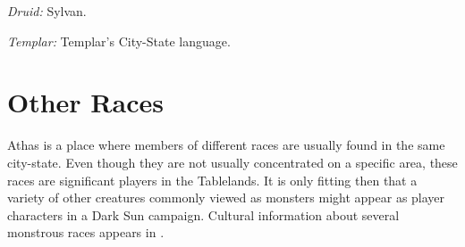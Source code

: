 \textit{Druid:} Sylvan.

\textit{Templar:} Templar's City-State language.



% 






% 


\section{Other Races}
Athas is a place where members of different races are usually found in the same city-state. Even though they are not usually concentrated on a specific area, these races are significant players in the Tablelands. It is only fitting then that a variety of other creatures commonly viewed as monsters might appear as player characters in a {\tableheader Dark Sun} campaign. Cultural information about several monstrous races appears in .

